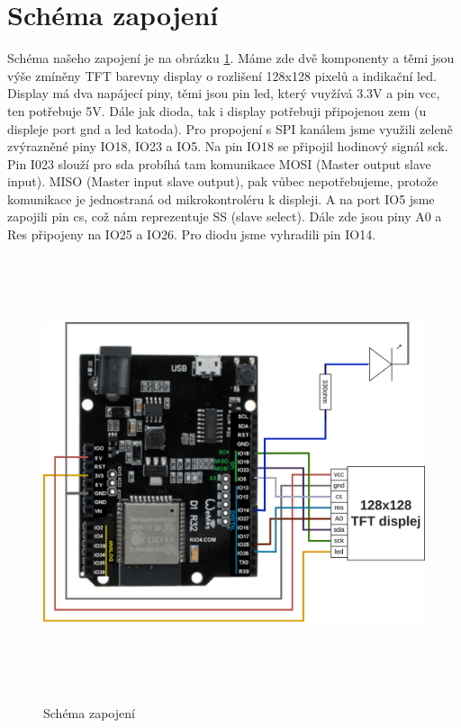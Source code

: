 \section{Schéma zapojení}
Schéma našeho zapojení je na obrázku \ref{fig:schema}. Máme zde dvě komponenty a těmi jsou výše zmíněny TFT barevny display o rozlišení 128x128 pixelů a indikační led. Display má dva napájecí piny, těmi jsou pin led, který vuyžívá 3.3V a pin vcc, ten potřebuje 5V. Dále jak dioda, tak i display potřebuji připojenou zem (u displeje port gnd a led katoda). Pro propojení s SPI kanálem jsme využili zeleně zvýrazněné piny IO18, IO23 a IO5. Na pin IO18 se připojil hodinový signál sck. Pin I023 slouží pro sda probíhá tam komunikace MOSI (Master output slave input). MISO (Master input slave output), pak vůbec nepotřebujeme, protože komunikace je jednostraná od mikrokontroléru k displeji. A na port IO5 jsme zapojili pin cs, což nám reprezentuje SS (slave select). Dále zde jsou piny A0 a Res připojeny na IO25 a IO26. Pro diodu jsme vyhradili pin IO14.
\begin{figure}[h]%
  \centering
  \includegraphics[width=\linewidth,height=5in]{img/scheme.png}\\[1pt]
  \caption{Schéma zapojení}
  \label{fig:schema}
\end{figure} 

